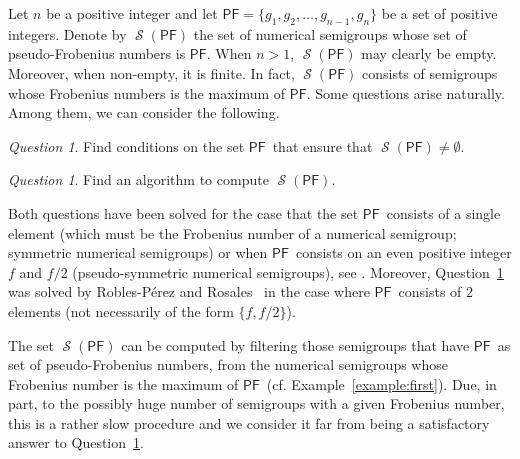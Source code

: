 \documentclass[11pt]{amsart}
\theoremstyle{remark}
\newtheorem{question}[theorem]{Question}
\begin{document}
Let $n$ be a positive integer and let ${\ensuremath{\mathsf{PF}}} = \{g_1,g_2,\ldots,g_{n-1}, g_n\}$ be a set of positive integers.
Denote by $\operatorname{\mathcal{S}}({\ensuremath{\mathsf{PF}}})$ the set of numerical semigroups whose set of pseudo-Frobenius numbers is {\ensuremath{\mathsf{PF}}}. When $n>1$, $\operatorname{\mathcal{S}}({\ensuremath{\mathsf{PF}}})$ may clearly be empty. Moreover, when non-empty, it is finite. In fact, $\operatorname{\mathcal{S}}({\ensuremath{\mathsf{PF}}})$ consists of semigroups whose Frobenius numbers is the maximum of {\ensuremath{\mathsf{PF}}}.
 Some questions arise naturally. Among them, we can consider the following.
\begin{question}\label{quest:existence}
Find conditions on the set {\ensuremath{\mathsf{PF}}}\ that ensure that $\operatorname{\mathcal{S}}({\ensuremath{\mathsf{PF}}})\ne \emptyset$.
\end{question}
\begin{question}\label{quest:compute_all}
Find an algorithm to compute $\operatorname{\mathcal{S}}({\ensuremath{\mathsf{PF}}})$.
\end{question} 
Both questions have been solved for the case that the set {\ensuremath{\mathsf{PF}}}\ consists of a single element (which must be the Frobenius number of a numerical semigroup; symmetric numerical semigroups) or when {\ensuremath{\mathsf{PF}}}\ consists on an even positive integer $f$ and $f/2$ (pseudo-symmetric numerical semigroups), see \cite{br}.  
Moreover, Question~\ref{quest:existence} was solved by Robles-P\'erez and Rosales~\cite{RoblesRosales_preprint:type2} in the case where {\ensuremath{\mathsf{PF}}}\ consists of $2$ elements (not necessarily of the form $\{f,f/2\}$).

The set $\operatorname{\mathcal{S}}({\ensuremath{\mathsf{PF}}})$ can be computed by filtering those semigroups that have {\ensuremath{\mathsf{PF}}}\ as set of pseudo-Frobenius numbers, from the numerical semigroups whose Frobenius number is the maximum of {\ensuremath{\mathsf{PF}}}\ (cf. Example~\ref{example:first}). Due, in part, to the possibly huge number of semigroups with a given Frobenius number, this is a rather slow procedure and we consider it far from being a satisfactory answer to Question~\ref{quest:compute_all}. 
\end{document}
